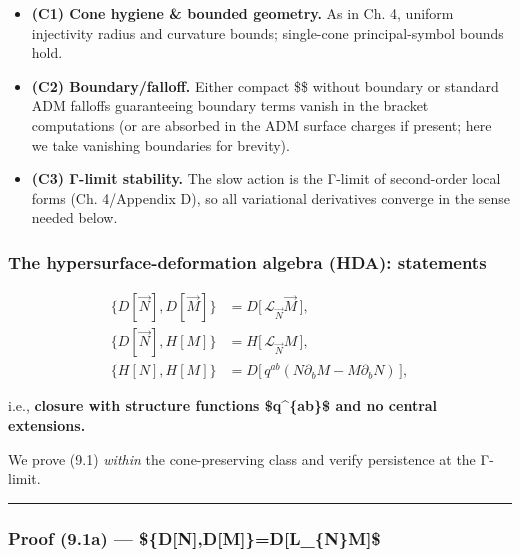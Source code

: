 \documentclass[
]{article}
\providecommand{\tightlist}{%
  \setlength{\itemsep}{0pt}\setlength{\parskip}{0pt}}
\numberwithin{equation}{section}
\begin{document}
\begin{itemize}
\tightlist
\item
  \textbf{(C1) Cone hygiene \& bounded geometry.} As in Ch. 4, uniform
  injectivity radius and curvature bounds; single-cone principal-symbol
  bounds hold.
\item
  \textbf{(C2) Boundary/falloff.} Either compact \$\Sigma\$ without
  boundary or standard ADM falloffs guaranteeing boundary terms vanish
  in the bracket computations (or are absorbed in the ADM surface
  charges if present; here we take vanishing boundaries for brevity).
\item
  \textbf{(C3) Γ-limit stability.} The slow action is the Γ-limit of
  second-order local forms (Ch. 4/Appendix D), so all variational
  derivatives converge in the sense needed below.
\end{itemize}

\hypertarget{the-hypersurface-deformation-algebra-hda-statements}{%
\subsubsection{The hypersurface-deformation algebra (HDA):
statements}\label{the-hypersurface-deformation-algebra-hda-statements}}

\[
\boxed{
\begin{aligned}
\{D[\vec N],D[\vec M]\} &= D\!\big[\,\mathcal L_{\vec N}\vec M\,\big],\\[2pt]
\{D[\vec N],H[M]\} &= H\!\big[\,\mathcal L_{\vec N} M\,\big],\\[2pt]
\{H[N],H[M]\} &= D\!\big[\,q^{ab}(N\partial_b M - M\partial_b N)\,\big],
\end{aligned}}
\tag{9.1}
\]

i.e., \textbf{closure with structure functions \$q\^{}\{ab\}\$ and no
central extensions.}

We prove (9.1) \emph{within} the cone-preserving class and verify
persistence at the Γ-limit.

\begin{center}\rule{0.5\linewidth}{0.5pt}\end{center}

\hypertarget{proof-9.1a-dndmdl_nm}{%
\subsubsection{\texorpdfstring{Proof (9.1a) ---
\$\{D{[}\vec N{]},D{[}\vec M{]}\}=D{[}\mathcal L\_\{\vec N\}\vec M{]}\$}{Proof (9.1a) --- \$\{D{[}N{]},D{[}M{]}\}=D{[}L\_\{N\}M{]}\$}}\label{proof-9.1a-dndmdl_nm}}
\end{document}
